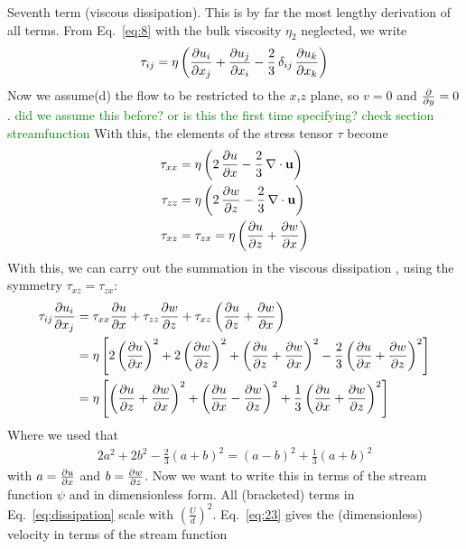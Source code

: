 \documentclass[a4paper]{article}
\begin{document}
\begin{mdframed}
    Seventh term (viscous dissipation). This is by far the most lengthy derivation of all terms. From Eq.~\eqref{eq:8} with the bulk viscosity $\eta_2$ neglected, we write 
    \begin{align*}
        \tau_{ij} = \eta \left( \pdv{u_i}{x_j} + \pdv{u_j}{x_i} - \frac{2}{3}\,\delta_{ij}\,\pdv{u_k}{x_k} \right)
    \end{align*}
    Now we assume(d) the flow to be restricted to the $x$,$z$ plane, so $v=0$ and $\pdv{y} =0$. 
    \textcolor{green}{did we assume this before? or is this the first time specifying? check section streamfunction}
    With this, the elements of the stress tensor $\tau$ become
    \begin{align*}
        \tau_{xx} &= \eta \left( 2\,\pdv{u}{x} - \frac{2}{3}\,\nabla \cdot \mathbf{u} \right) \\
        \tau_{zz} &= \eta \left( 2\,\pdv{w}{z} - \frac{2}{3}\,\nabla \cdot \mathbf{u} \right) \\
        \tau_{xz} &= \tau_{zx} = \eta \left( \pdv{u}{z} + \pdv{w}{x} \right) \\
    \end{align*} 
    With this, we can carry out the summation in the viscous dissipation , using the symmetry $\tau_{xz} = \tau_{zx}$: 
    \begin{align} \label{eq:dissipation}
            \tau_{ij}\pdv{u_i}{x_j} &= \tau_{xx}\pdv{u}{x} + \tau_{zz}\pdv{w}{z} + \tau_{xz}\left(\pdv{u}{z} + \pdv{w}{x}\right) \notag\\
     &= \eta \left[ 2\left(\pdv{u}{x}\right)^{2} + 2\left(\pdv{w}{z}\right)^{2}
        + \left( \pdv{u}{z} + \pdv{w}{x} \right)^{2}
        - \frac{2}{3}\left( \pdv{u}{x} + \pdv{w}{z} \right)^{2} \right] \notag\\
    &= \eta \left[ \left( \pdv{u}{z} + \pdv{w}{x} \right)^{2}
        + \left( \pdv{u}{x} - \pdv{w}{z} \right)^{2}
        + \frac{1}{3}\left( \pdv{u}{x} + \pdv{w}{z} \right)^{2} \right]
    \end{align} 
    Where we used that 
    \begin{align*}
        2a^{2} + 2b^{2} - \frac{2}{3}(a+b)^{2} = (a-b)^{2} + \frac{1}{3}(a+b)^{2}
    \end{align*}
    with $a = \pdv{u}{x}$ and  $b = \pdv{w}{z}$. 
    Now we want to write this in terms of the stream function $\psi$ and in dimensionless form.
    All (bracketed) terms in Eq.~\eqref{eq:dissipation} scale with $\left(\frac{U}{d}\right)^2$.
    Eq.~\eqref{eq:23} gives the (dimensionless) velocity in terms of the stream function 

\end{mdframed}
\end{document}
